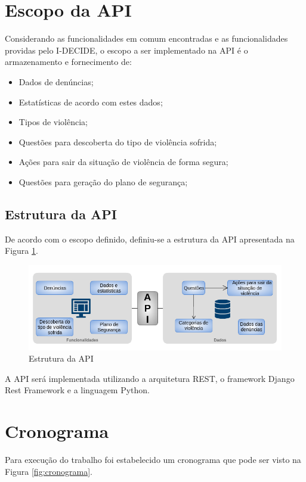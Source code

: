 \section{Escopo da API}

Considerando as funcionalidades em comum encontradas e as funcionalidades providas pelo I-DECIDE, 
o escopo a ser implementado na API é o armazenamento e fornecimento de:

\begin{itemize}
	\item Dados de denúncias;
	\item Estatísticas de acordo com estes dados;
	\item Tipos de violência;
	\item Questões para descoberta do tipo de violência sofrida;
	\item Ações para sair da situação de violência de forma segura;
	\item Questões para geração do plano de segurança;
\end{itemize}


\subsection{Estrutura da API}

De acordo com o escopo definido, definiu-se a estrutura da API apresentada na Figura \ref{fig:estrutura_api}.

\begin{figure}[h!]
\centering
\includegraphics[scale=0.7]{figuras/estrutura_api.png}
\caption{Estrutura da API}
\label{fig:estrutura_api}
\end{figure}

A API será implementada utilizando a arquitetura REST, o framework Django Rest Framework e a linguagem Python.

\section{Cronograma}

Para execução do trabalho foi estabelecido um cronograma que pode ser visto na Figura \ref{fig:cronograma}.

